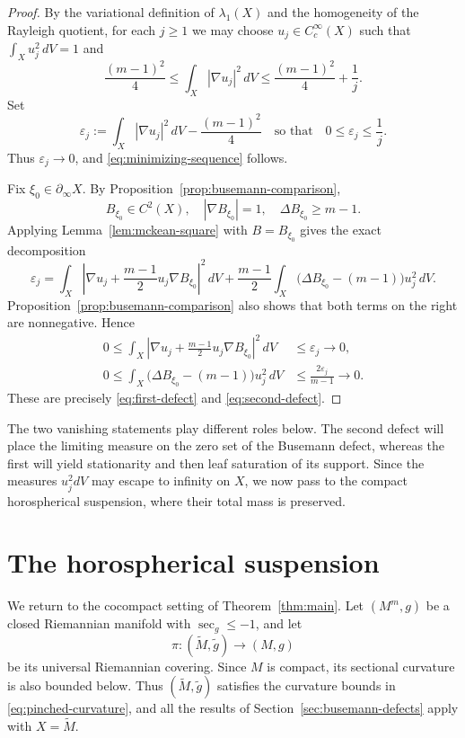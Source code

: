 \documentclass[12pt]{amsart}
\theoremstyle{definition}
\numberwithin{equation}{section}
\newcommand{\wti}{\widetilde}
\begin{document}
\begin{proof}
By the variational definition of \(\lambda_1(X)\) and the homogeneity of
the Rayleigh quotient, for each \(j\geq1\) we may choose
\(u_j\in C_c^\infty(X)\) such that \(\int_Xu_j^2\,dV=1\) and
\[
  \frac{(m-1)^2}{4}
  \leq\int_X|\nabla u_j|^2\,dV
  \leq\frac{(m-1)^2}{4}+\frac1j.
\]
Set
\[
  \varepsilon_j
  :=\int_X|\nabla u_j|^2\,dV-\frac{(m-1)^2}{4}
  \quad\text{so that}\quad
  0\leq\varepsilon_j\leq\frac1j.
\]
Thus \(\varepsilon_j\to0\), and
\eqref{eq:minimizing-sequence} follows.

Fix \(\xi_0\in\partial_\infty X\).  By
Proposition~\ref{prop:busemann-comparison},
\[
  B_{\xi_0}\in C^2(X),\quad
  |\nabla B_{\xi_0}|=1,\quad
  \Delta B_{\xi_0}\geq m-1.
\]
Applying Lemma~\ref{lem:mckean-square} with \(B=B_{\xi_0}\) gives the exact
decomposition
\[
  \varepsilon_j
  =\int_X\left|\nabla u_j+\frac{m-1}{2}u_j\nabla B_{\xi_0}\right|^2\,dV
   +\frac{m-1}{2}\int_X
    \bigl(\Delta B_{\xi_0}-(m-1)\bigr)u_j^2\,dV.
\]
Proposition~\ref{prop:busemann-comparison} also shows that both terms on the
right are nonnegative.  Hence
\begin{align*}
  0\leq
  \int_X\left|
    \nabla u_j+\frac{m-1}{2}u_j\nabla B_{\xi_0}
  \right|^2\,dV
  &\leq\varepsilon_j\longrightarrow0,\\
  0\leq
  \int_X\bigl(\Delta B_{\xi_0}-(m-1)\bigr)u_j^2\,dV
  &\leq\frac{2\varepsilon_j}{m-1}\longrightarrow0.
\end{align*}
These are precisely \eqref{eq:first-defect} and
\eqref{eq:second-defect}.
\end{proof}

The two vanishing statements play different roles below.  The second defect
will place the limiting measure on the zero set of the Busemann defect,
whereas the first will yield stationarity and then leaf saturation of its
support.  Since the measures \(u_j^2dV\) may escape to infinity on \(X\), we
now pass to the compact horospherical suspension, where their total mass is
preserved.

\section{The horospherical suspension}
\label{sec:suspension}

We return to the cocompact setting of Theorem~\ref{thm:main}.  Let
\((M^m,g)\) be a closed Riemannian manifold with \(\sec_g\leq-1\), and let
\[
  \pi\colon(\wti M,\wti g)\longrightarrow(M,g)
\]
be its universal Riemannian covering.  Since \(M\) is compact, its sectional
curvature is also bounded below.  Thus \((\wti M,\wti g)\) satisfies the
curvature bounds in \eqref{eq:pinched-curvature}, and all the results of
Section~\ref{sec:busemann-defects} apply with \(X=\wti M\).
\end{document}
